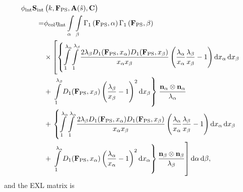 \begin{equation} \label{c6:eq:fullinteractions}
\begin{split}
\phi_\mathrm{int}\mathbf{S}_\mathrm{int}&\left(k , \mathbf{F}_\mathrm{PS}, \mathbf{A}(\hat{s}), \mathbf{C}\right) \\
=& \phi_\mathrm{col} \eta_\mathrm{int} \int\displaylimits_\alpha \int\displaylimits_\beta \Gamma_1 \left(\mathbf{F}_\mathrm{PS}, \alpha \right) \Gamma_1 \left(\mathbf{F}_\mathrm{PS},  \beta \right) \\
&\times\left[ \left\lbrace 
\int\displaylimits_1^{\lambda_\alpha} \int\displaylimits_1^{\lambda_\beta} 
\frac{2 \lambda_\beta D_1(\mathbf{F}_\mathrm{PS}, x_\alpha) D_1(\mathbf{F}_\mathrm{PS}, x_\beta)}{x_\alpha x_\beta} 
\left( \frac{\lambda_\alpha}{x_\alpha} \frac{\lambda_\beta}{x_\beta} - 1\right) \mathrm{d}x_\alpha \, \mathrm{d}x_\beta \right.\right. \\
&+ \left. \left. \int\displaylimits_1^{\lambda_\beta} D_1(\mathbf{F}_\mathrm{PS}, x_\beta) \left( \frac{\lambda_\beta}{x_\beta} -1  \right)^2 \mathrm{d}x_\beta \right\rbrace \right.  \frac{\mathbf{n}_\alpha \otimes \mathbf{n}_\alpha}{\lambda_\alpha}  \\
&+ \left. \left\lbrace
\int\displaylimits_1^{\lambda_\alpha} \int\displaylimits_1^{\lambda_\alpha} 
\frac{2 \lambda_\beta D_1(\mathbf{F}_\mathrm{PS}, x_\alpha) D_1(\mathbf{F}_\mathrm{PS}, x_\beta)}{x_\alpha x_\beta} 
\left( \frac{\lambda_\alpha}{x_\alpha} \frac{\lambda_\beta}{x_\beta} - 1\right) \mathrm{d}x_\alpha \, \mathrm{d}x_\beta 
\right. \right. \\
&+\left. \left. \int\displaylimits_1^{\lambda_\alpha} D_1(\mathbf{F}_\mathrm{PS}, x_\alpha) \left( \frac{\lambda_\alpha}{x_\alpha} -1  \right)^2 \mathrm{d}x_\alpha \right\rbrace \frac{\mathbf{n}_\beta \otimes \mathbf{n}_\beta}{\lambda_\beta}  \right] \mathrm{d}\alpha \, \mathrm{d}\beta,
\end{split}
\end{equation}
and the EXL matrix is
